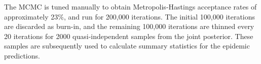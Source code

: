 \documentclass[a4paper]{article}
\begin{document}
\begin{appendices}
The MCMC is tuned manually to obtain Metropolis-Hastings acceptance rates of approximately
23\%, and run for 200,000 iterations.  The initial 100,000 iterations are discarded as
burn-in, and the remaining 100,000 iterations are thinned every 20 iterations for 2000
quasi-independent samples from the joint posterior.  These samples are subsequently used
to calculate summary statistics for the epidemic predictions. 

\end{appendices}
\end{document}
